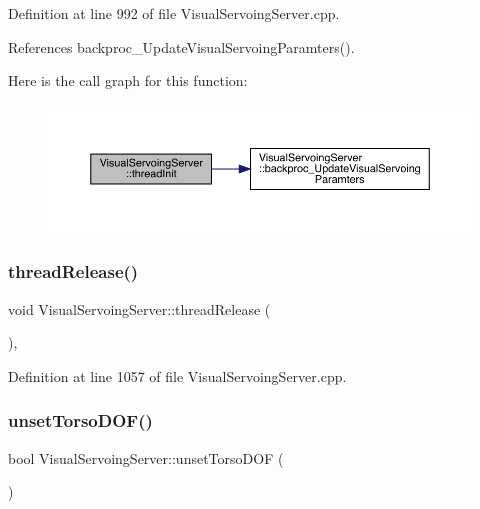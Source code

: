 Definition at line 992 of file Visual\+Servoing\+Server.\+cpp.



References backproc\+\_\+\+Update\+Visual\+Servoing\+Paramters().

Here is the call graph for this function\+:
\nopagebreak
\begin{figure}[H]
\begin{center}
\leavevmode
\includegraphics[width=350pt]{classVisualServoingServer_aa8673d3ac18d4aa4be94e8354ef0bad5_cgraph}
\end{center}
\end{figure}
\mbox{\label{classVisualServoingServer_a65744a18718c014e19f882dc1052a517}} 
\subsubsection{\texorpdfstring{thread\+Release()}{threadRelease()}}
{\footnotesize\ttfamily void Visual\+Servoing\+Server\+::thread\+Release (\begin{DoxyParamCaption}{ }\end{DoxyParamCaption})\hspace{0.3cm}{\ttfamily [override]}, {\ttfamily [protected]}}



Definition at line 1057 of file Visual\+Servoing\+Server.\+cpp.

\mbox{\label{classVisualServoingServer_a509750822f0f1e0db26d54288f8eb1fd}} 
\subsubsection{\texorpdfstring{unset\+Torso\+D\+O\+F()}{unsetTorsoDOF()}}
{\footnotesize\ttfamily bool Visual\+Servoing\+Server\+::unset\+Torso\+D\+OF (\begin{DoxyParamCaption}{ }\end{DoxyParamCaption})\hspace{0.3cm}{\ttfamily [private]}}



